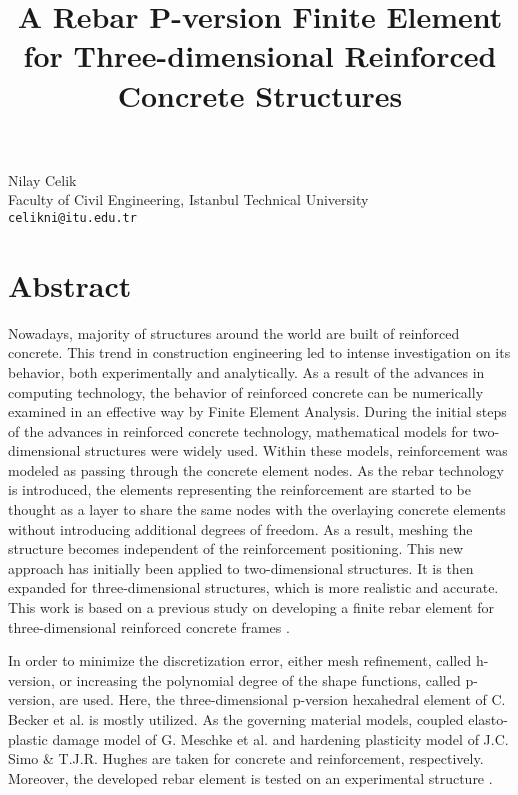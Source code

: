 \title{A Rebar P-version Finite Element for Three-dimensional Reinforced Concrete Structures}
\author{} \institute{}
\maketitle

\begin{center}
{\large  Nilay Celik}\\
Faculty of Civil Engineering, Istanbul Technical University\\
{\tt celikni@itu.edu.tr}
\end{center}

\section*{Abstract}
Nowadays, majority of structures around the world are built of reinforced concrete. This trend in construction engineering led to intense investigation on its behavior, both experimentally and analytically. As a result of the advances in computing technology, the behavior of reinforced concrete can be numerically examined in an effective way by Finite Element Analysis. During the initial steps of the advances in reinforced concrete technology, mathematical models for two-dimensional structures were widely used. Within these models, reinforcement was modeled as passing through the concrete element nodes. As the rebar technology is introduced, the elements representing the reinforcement are started to be thought as a layer to share the same nodes with the overlaying concrete elements without introducing additional degrees of freedom. As a result, meshing the structure becomes independent of the reinforcement positioning. This new approach has initially been applied to two-dimensional structures. It is then expanded for three-dimensional structures, which is more realistic and accurate. This work is based on a previous study on developing a finite rebar element for three-dimensional reinforced concrete frames \cite{Celik04}.

In order to minimize the discretization error, either mesh refinement, called h-version, or increasing the polynomial degree of the shape functions, called p-version, are used. Here, the three-dimensional p-version hexahedral element of C. Becker et al. \cite{Becker09} is mostly utilized. As the governing material models, coupled elasto-plastic damage model of G. Meschke et al. \cite{Meschke98} and hardening plasticity model of J.C. Simo \& T.J.R. Hughes \cite{Simo98} are taken for concrete and reinforcement, respectively. Moreover, the developed rebar element is tested on an experimental structure \cite{Tsuchiya02}.

